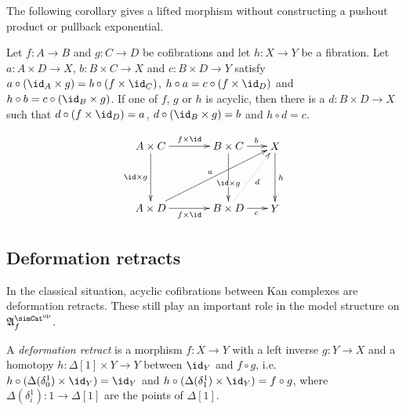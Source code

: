 \documentclass{tac}
\newcommand\hide[1]{}
\newcommand\dual{^{\mathrm{op}}}
\newcommand\s{^{\simCat\dual}}
\newcommand\of{:}
\newcommand\simplex\Delta
\newcommand\f{_f}
\newcommand\ambient{\mathfrak A}
\begin{document}
The following corollary gives a lifted morphism without constructing a pushout product or pullback exponential.

\begin{corollary} Let $f\of A\to B$ and $g\of C\to D$ be cofibrations and let $h\of X\to Y$ be a fibration. Let $a\of A\times D\to X$, $b\of B\times C\to X$ and $c\of B \times D\to Y$ satisfy $a\circ(\id_A\times g) = b\circ(f\times \id_C)$, $h\circ a=c\circ(f\times \id_D)$ and $h\circ b=c\circ(\id_B\times g)$. If one of $f$, $g$ or $h$ is acyclic, then there is a $d\of B\times D\to X$ such that $d\circ(f\times\id_D)=a$, $d\circ(\id_B\times g)=b$ and $h\circ d = c$.
\hide{\[\xymatrix{
A\times C\ar[r]^{f\times \id}\ar[d]_{\id\times g} & B\times C\ar[r]^b\ar[d]_(.3){\id\times g} & X\ar[d]^h\\
A\times D\ar[r]_{f\times \id} \ar[urr]^(.3){a} & B\times D \ar[r]_c \ar@{.>}[ur]_{d} & Y
}\]}
\[\xy
(0,20)*+{A\times C}="AC",(25,20)*+{B\times C}="BC",(40,20)*+{X}="X",
(0,0)*+{A\times D}="AD",(25,0)*+{B\times D}="BD",(40,0)*+{Y}="Y"
\ar^{f\times\id} "AC";"BC"
\ar_{\id\times g} "AC";"AD"
\ar_{f\times\id} "AD";"BD"
\ar^{a} "AD";"X"
\ar|(.6){\id\times g} "BC";"BD"
\ar^(.6){b} "BC";"X"
\ar@{.>}_{d} "BD";"X"
\ar_(.6){c} "BD";"Y"
\ar^{h} "X";"Y"
\endxy\]

\hide{Transposed view:
\[\xymatrix{
A\ar[r]^{a^t}\ar[d]_f & X^D\ar[r]^{X^g}\ar[d]^(.7){h^D} & X^C\ar[d]^{h^C}\\
B\ar[r]_{c^t} \ar[urr]_(.7){b^t} \ar@{.>}[ur]^{d^t} & Y^D \ar[r]_{Y^g} & Y^C
}\]}\label{triple lift}
\end{corollary}

\subsection{Deformation retracts}
In the classical situation, acyclic cofibrations between Kan complexes are deformation retracts. These still play an important role in the model structure on $\ambient\s\f$.

\begin{definition} A \emph{deformation retract} is a morphism $f\of X\to Y$ with a left inverse $g\of Y\to X$ and a homotopy $h\of \simplex[1]\times Y\to Y$ between $\id_Y$ and $f\circ g$, i.e.\ $h\circ (\Delta(\delta^1_0)\times \id_Y) = \id_Y$ and $h\circ (\Delta(\delta^1_1)\times \id_Y) = f\circ g$, where $\Delta(\delta^1_i)\of 1\to \simplex[1]$ are the points of $\simplex[1]$.
\end{definition}
\end{document}
